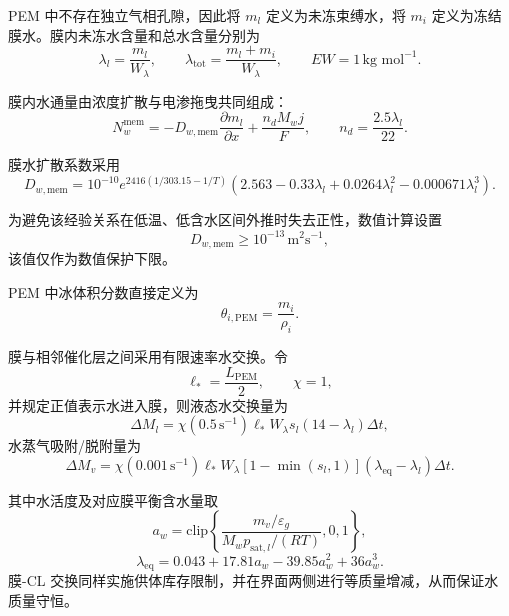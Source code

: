 \documentclass[bwprint]{gmcmthesis}
\numberwithin{figure}{section}
\begin{document}
\begin{itemize}
 PEM 中不存在独立气相孔隙，因此将 \(m_l\) 定义为未冻束缚水，将 \(m_i\) 定义为冻结膜水。膜内未冻水含量和总水含量分别为
\begin{equation}
\lambda_l = \frac{m_l}{W_\lambda}, \qquad \lambda_{\text{tot}} = \frac{m_l + m_i}{W_\lambda}, \qquad EW = 1 \, \text{kg mol}^{-1}. \tag{4-36}
\end{equation}

 膜内水通量由浓度扩散与电渗拖曳共同组成：
\begin{equation}
N_w^{\text{mem}} = -D_{w,\text{mem}} \frac{\partial m_l}{\partial x} + \frac{n_d M_w j}{F}, \qquad n_d = \frac{2.5\lambda_l}{22}. \tag{4-37}
\end{equation}

 膜水扩散系数采用
\begin{equation}
D_{w,\text{mem}} = 10^{-10} e^{2416(1/303.15 - 1/T)} \left( 2.563 - 0.33\lambda_l + 0.0264\lambda_l^2 - 0.000671\lambda_l^3 \right). \tag{4-38}
\end{equation}

{\color{red}  为避免该经验关系在低温、低含水区间外推时失去正性，数值计算设置
\[
D_{w,\text{mem}} \ge 10^{-13} \, \text{m}^2\text{s}^{-1},
\]
 该值仅作为数值保护下限。

 PEM 中冰体积分数直接定义为
\begin{equation}
\theta_{i,\text{PEM}} = \frac{m_i}{\rho_i}. \tag{4-39}
\end{equation}

 膜与相邻催化层之间采用有限速率水交换。令
\[
\ell_* = \frac{L_{\text{PEM}}}{2}, \qquad \chi = 1,
\]
 并规定正值表示水进入膜，则液态水交换量为
\begin{equation}
\Delta M_l = \chi(0.5 \, \text{s}^{-1})\ell_* W_\lambda s_l(14 - \lambda_l)\Delta t,
\tag{4-40}
\end{equation}
 水蒸气吸附/脱附量为
\begin{equation}
\Delta M_v = \chi(0.001 \, \text{s}^{-1})\ell_* W_\lambda [1 - \min(s_l, 1)](\lambda_{\text{eq}} - \lambda_l)\Delta t.
\tag{4-41}
\end{equation}

 其中水活度及对应膜平衡含水量取
\begin{equation}
a_w = \text{clip}\left\{ \frac{m_v / \varepsilon_g}{M_w p_{\text{sat},l} / (RT)}, 0, 1 \right\},
\tag{4-42}
\end{equation}
\begin{equation}
\lambda_{\text{eq}} = 0.043 + 17.81 a_w - 39.85 a_w^2 + 36 a_w^3.
\tag{4-43}
\end{equation}
 膜-CL 交换同样实施供体库存限制，并在界面两侧进行等质量增减，从而保证水质量守恒。}


\end{itemize}
\end{document}
